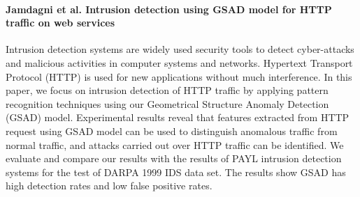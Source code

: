 \paragraph*{Jamdagni et al. Intrusion detection using GSAD model for HTTP traffic on web services}
\cite{jamdagni2010intrusion}
Intrusion detection systems are widely used security tools to detect cyber-attacks and malicious activities in computer systems and networks. Hypertext Transport Protocol (HTTP) is used for new applications without much interference. In this paper, we focus on intrusion detection of HTTP traffic by applying pattern recognition techniques using our Geometrical Structure Anomaly Detection (GSAD) model. Experimental results reveal that features extracted from HTTP request using GSAD model can be used to distinguish anomalous traffic from normal traffic, and attacks carried out over HTTP traffic can be identified. We evaluate and compare our results with the results of PAYL intrusion detection systems for the test of DARPA 1999 IDS data set. The results show GSAD has high detection rates and low false positive rates.

